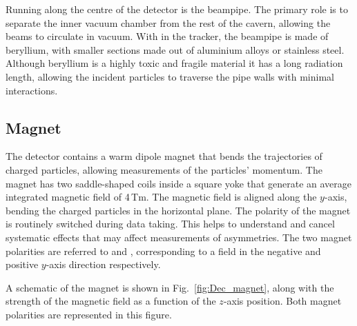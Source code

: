 Running along the centre of the detector is the \lhcb beampipe. The primary role is to separate the inner vacuum chamber from the rest of the cavern, allowing the beams to circulate in vacuum. With in the \lhcb tracker, the beampipe is made of beryllium, with smaller sections made out of aluminium alloys or stainless steel. Although beryllium is a highly toxic and fragile material it has a long radiation length, allowing the incident particles to traverse the pipe walls with minimal interactions.  


\subsection{Magnet}

The \lhcb detector contains a warm dipole magnet that bends the trajectories of charged particles, allowing measurements of the particles' momentum. The magnet has two saddle-shaped coils inside a square yoke that generate an average integrated magnetic field of 4\,Tm.  
The magnetic field is aligned along the $y$-axis, bending the charged particles in the horizontal plane. The polarity of the magnet is routinely switched during data taking. This helps to understand and cancel systematic effects that may affect measurements of \CP asymmetries. The two magnet polarities are referred to \MagDown and \MagUp, corresponding to a field in the negative and positive $y$-axis direction respectively.   

A schematic of the magnet is shown in Fig.~\ref{fig:Dec_magnet}, along with the strength of the magnetic field as a function of the $z$-axis position. Both magnet polarities are represented in this figure. 


